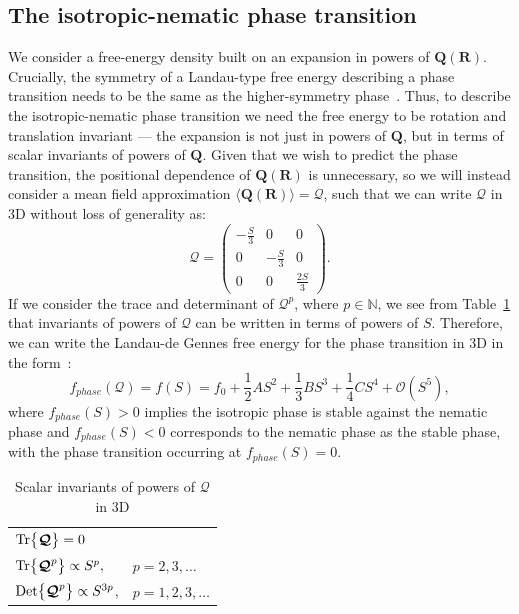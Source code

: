 \subsection{The isotropic-nematic phase transition}
We consider a free-energy density built on an expansion in powers of $\mathbf{Q}(\mathbf{R})$.
Crucially, the symmetry of a Landau-type free energy describing a phase transition needs to be the same as the higher-symmetry phase~\cite{RN33,RN175}.
Thus, to describe the isotropic-nematic phase transition we need the free energy to be rotation and translation invariant --- the expansion is not just in powers of $\mathbf{Q}$, but in terms of scalar invariants of powers of $\mathbf{Q}$.
Given that we wish to predict the phase transition, the positional dependence of $\mathbf{Q}(\mathbf{R})$ is unnecessary, so we will instead consider a mean field approximation $\langle \mathbf{Q}(\mathbf{R}) \rangle = \bm{\mathcal{Q}}$, such that we can write $\bm{\mathcal{Q}}$ in 3D without loss of generality as:
\begin{equation}
  \bm{\mathcal{Q}} =
    \begin{pmatrix}
        -\frac{S}{3} & 0 & 0 \\
        0 & -\frac{S}{3} & 0 \\
        0 & 0 & \frac{2S}{3}
    \end{pmatrix}.
\end{equation}
If we consider the trace and determinant of $\bm{\mathcal{Q}}^p$, where $p \in \mathbb{N}$, we see from Table~\ref{t:2-powersQ} that invariants of powers of $\bm{\mathcal{Q}}$ can be written in terms of powers of $S$.
Therefore, we can write the Landau-de Gennes free energy for the phase transition in 3D in the form~\cite{RN33,RN175}:
\begin{equation}
  f_{phase}(\bm{\mathcal{Q}}) = f(S) = f_0 + \frac{1}{2}A S^2 + \frac{1}{3}B S^3 + \frac{1}{4}C S^4 + \mathcal{O} \left (S^5 \right ),\label{e:2-LdGTransGeneral}
\end{equation}
where $f_{phase}(S) > 0$ implies the isotropic phase is stable against the nematic phase and $f_{phase}(S) < 0$ corresponds to the nematic phase as the stable phase, with the phase transition occurring at $f_{phase}(S) = 0$.
\begin{table}[t]
  \centering
  \caption{Scalar invariants of powers of $\bm{\mathcal{Q}}$ in 3D}
  \label{t:2-powersQ}
  \begin{tabular}{|l l|}
    \hline
    $\textup{Tr} \big \{ \bm{\mathcal{Q}} \big \} = 0$ & \\
    $\textup{Tr} \big \{ \bm{\mathcal{Q}}^p \big \} \propto S^p,$ & $p = 2,3, \dots$ \\
    $\textup{Det} \big \{ \bm{\mathcal{Q}}^p \big \} \propto S^{3p}$, & $p = 1,2,3,\dots$ \\
    \hline
  \end{tabular}
\end{table}
